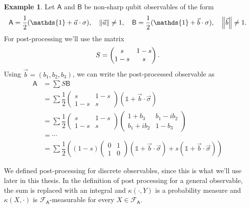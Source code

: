 \documentclass[a4paper,12pt]{wihuri}
\theoremstyle{definition}
\newtheorem{example}{Example}
\numberwithin{definition}{section}
\numberwithin{example}{section}
\numberwithin{theorem}{section}
\numberwithin{proposition}{section}
\numberwithin{lemma}{section}
\newcommand{\salg}{\mathcal{F}}%
\newcommand{\A}{\mathsf{A}}%
\newcommand{\B}{\mathsf{B}}%
\newcommand{\id}{\mathds{1}}
\newcommand{\norm}[1]{\left\lVert#1\right\rVert}
\begin{document}
\begin{example}
Let $\A$ and $\B$ be non-sharp qubit observables of the form
\begin{align*}
\A = \dfrac{1}{2}(\id + \vec{a}\cdot\sigma),\quad \norm{\vec{a}} \neq 1, \quad \B = \dfrac{1}{2}(\id + \vec{b}\cdot\sigma),\quad \norm{\vec{b}} \neq 1 \text.
\end{align*}
For post-processing we'll use the matrix 
\begin{align*}
S=\begin{pmatrix}
s & 1-s \\
1-s & s
\end{pmatrix}\text.
\end{align*}
Using $\vec{b} = (b_1, b_2, b_3)$, we can write the post-processed observable as
\begin{align*}
\A &= \sum S\B\\
&=\sum \dfrac{1}{2} \begin{pmatrix}
s & 1-s \\
1-s & s
\end{pmatrix}
(\id + \vec{b}\cdot\vec{\sigma})\\
&=\sum \dfrac{1}{2} \begin{pmatrix}
s & 1-s \\
1-s & s
\end{pmatrix}
\begin{pmatrix}
1+b_3 & b_1-ib_2 \\
b_1+ib_2 & 1-b_3
\end{pmatrix}\\
&=\cdots\\
&=\sum \dfrac{1}{2}\left((1-s)\begin{pmatrix}
0 & 1 \\
1 & 0
\end{pmatrix}
(\id + \vec{b}\cdot\vec{\sigma})+s(\id + \vec{b}\cdot\vec{\sigma})\right)
\end{align*}

\end{example}

We defined post-processing for discrete observables, since this is what we'll use later in this thesis. In the definition of post processing for a general observable, the sum is replaced with an integral and $\kappa(\cdot, Y)$ is a probability measure and $\kappa(X, \cdot)$ is $\salg_\A$-measurable for every $X\in\salg_\A$.
\end{document}
